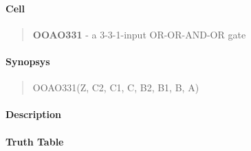 \label{OOAO331}
\paragraph{Cell}
\begin{quote}
    \textbf{OOAO331} - a 3-3-1-input OR-OR-AND-OR gate
\end{quote}

\paragraph{Synopsys}
\begin{quote}
    OOAO331(Z, C2, C1, C, B2, B1, B, A)
\end{quote}

\paragraph{Description}

%

\paragraph{Truth Table}
%

